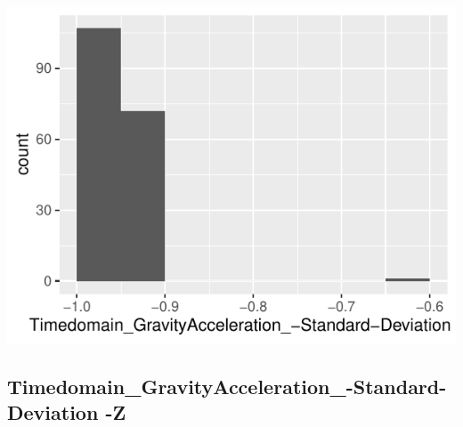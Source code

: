 \documentclass[
]{article}
\begin{document}
\begin{minipage}{0.25 \textwidth}

\includegraphics{codebook_tidydatasub_files/figure-latex/Var-13-Timedomain-GravityAcceleration--Standard-Deviation--Y-1.pdf}

\end{minipage}

\noindent\makebox[\linewidth]{\rule{\textwidth}{0.4pt}}

\hypertarget{timedomain_gravityacceleration_-standard-deviation--z}{%
\subsection{Timedomain\_GravityAcceleration\_-Standard-Deviation
-Z}\label{timedomain_gravityacceleration_-standard-deviation--z}}
\end{document}
